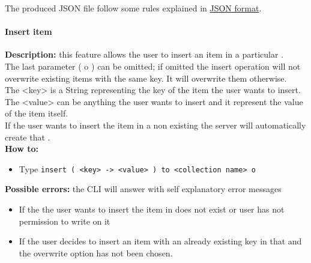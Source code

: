 \documentclass{scalatekids-article}
\begin{document}
The produced JSON file follow some rules explained in \hyperref[sec:JSONFormat]{JSON format}.

\paragraph{Insert item}
\label{sec:insertitem}
\textbf{Description:} this feature allows the user to insert an item in a particular .\\
The last parameter ( o ) can be omitted; if omitted the insert operation will not overwrite existing items with the same key. It will overwrite them otherwise. \\
The <key> is a String representing the key of the item the user wants to insert.\\
The <value> can be anything the user wants to insert and it represent the value of the item itself.\\
If the user wants to insert the item in a non existing  the server
will automatically create that .\\
\textbf{How to:}
\begin{itemize}
\item Type \texttt{insert ( <key> -> <value> ) to <collection name> o}
\end{itemize}
\textbf{Possible errors:} the CLI will answer with self explanatory error messages
\begin{itemize}
\item If the  the user wants to insert the item in does not exist or user has not permission to write on it
\item If the user decides to insert an item with an already existing key in that  and the overwrite option has not been chosen.
\end{itemize}
\end{document}
